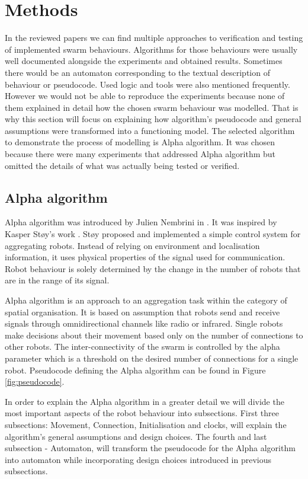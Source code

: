 \section{Methods}
In the reviewed papers we can find multiple approaches to verification and testing of implemented swarm behaviours. Algorithms for those behaviours were usually well documented alongside the experiments and obtained results. Sometimes there would be an automaton corresponding to the textual description of behaviour or pseudocode. Used logic and tools were also mentioned frequently. However we would not be able to reproduce the experiments because none of them explained in detail how the chosen swarm behaviour was modelled. That is why this section will focus on explaining how algorithm's pseudocode and general assumptions were transformed into a functioning model. The selected algorithm to demonstrate the process of modelling is Alpha algorithm. It was chosen because there were many experiments that addressed Alpha algorithm but omitted the details of what was actually being tested or verified.

\subsection{Alpha algorithm}
Alpha algorithm was introduced by Julien Nembrini in \cite{Minimalist_Coherent_Swarming_of_Wireless_Networked_Autonomous_Mobile_Robots}. It was inspired by Kasper Støy's work \cite{Using_Situated_Communication_in_Distributed_Autonomous_Mobile_Robotics}. Støy proposed and implemented a simple control system for aggregating robots. Instead of relying on environment and localisation information, it uses physical properties of the signal used for communication. Robot behaviour is solely determined by the change in the number of robots that are in the range of its signal.

Alpha algorithm is an approach to an aggregation task within the category of spatial organisation. It is based on assumption that robots send and receive signals through omnidirectional channels like radio or infrared. Single robots make decisions about their movement based only on the number of connections to other robots. The inter-connectivity of the swarm is controlled by the alpha parameter which is a threshold on the desired number of connections for a single robot. Pseudocode defining the Alpha algorithm can be found in Figure \ref{fig:pseudocode}.

In order to explain the Alpha algorithm in a greater detail we will divide the most important aspects of the robot behaviour into subsections. First three subsections: Movement, Connection, Initialisation and clocks, will explain the algorithm's general assumptions and design choices. The fourth and last subsection - Automaton, will transform the pseudocode for the Alpha algorithm into automaton while incorporating design choices introduced in previous subsections.

